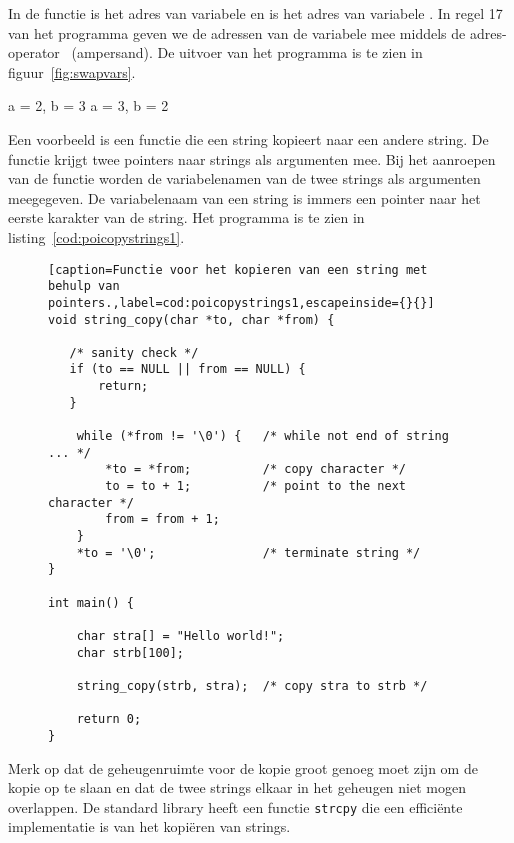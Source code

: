 In de functie  is  het adres van variabele  en is  het adres van variabele . In regel 17 van het programma geven we de adressen van de variabele mee middels de adres-operator~\lstc{\&} (ampersand).
De uitvoer van het programma is te zien in figuur~\ref{fig:swapvars}. %

\begin{dosbox}[title=Verwisselen van twee variabelen.,label=fig:swapvars]
a = 2, b = 3
a = 3, b = 2
\end{dosbox}

Een voorbeeld is een functie die een string kopieert naar een andere string. De functie krijgt twee pointers naar strings als argumenten mee. Bij het aanroepen van de functie worden de variabelenamen van de twee strings als argumenten meegegeven. De variabelenaam van een string is immers een pointer naar het eerste karakter van de string. Het programma is te zien in listing~\ref{cod:poicopystrings1}.

\begin{figure}[!ht]
\begin{lstlisting}[caption=Functie voor het kopieren van een string met behulp van pointers.,label=cod:poicopystrings1,escapeinside={}{}]
void string_copy(char *to, char *from) {

   /* sanity check */
   if (to == NULL || from == NULL) {
       return;
   }

    while (*from != '\0') {   /* while not end of string ... */
        *to = *from;          /* copy character */
        to = to + 1;          /* point to the next character */
        from = from + 1;
    }
    *to = '\0';               /* terminate string */
}

int main() {

    char stra[] = "Hello world!";
    char strb[100];

    string_copy(strb, stra);  /* copy stra to strb */

	return 0;
}
\end{lstlisting}
\end{figure}

Merk op dat de geheugenruimte voor de kopie groot genoeg moet zijn om de kopie op te slaan en dat de twee strings elkaar in het geheugen niet mogen overlappen. De standard library heeft een functie \texttt{strcpy} die een efficiënte implementatie is van het kopiëren van strings.

